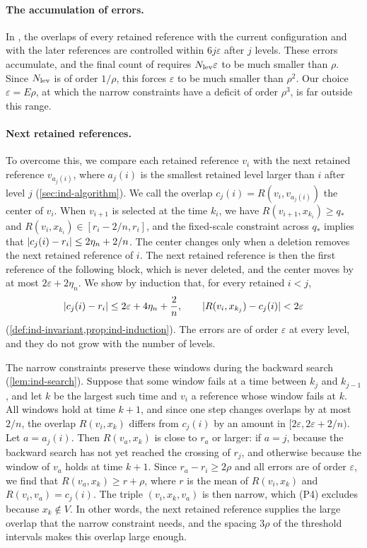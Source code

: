\paragraph{The accumulation of errors.} In
\cite[(8.19)--(8.20)]{oai-barriers}, the overlaps of every retained reference
with the current configuration and with the later references are controlled
within $6j\varepsilon$ after $j$ levels. These errors accumulate, and the final
count of \cite[(8.29)]{oai-barriers} requires $N_{\rm lev}\varepsilon$ to be
much smaller than $\rho$. Since $N_{\rm lev}$ is of order $1/\rho$, this forces
$\varepsilon$ to be much smaller than $\rho^2$. Our choice $\varepsilon=E\rho$,
at which the narrow constraints have a deficit of order $\rho^3$, is far outside
this range.

\paragraph{Next retained references.} To overcome this, we compare each
retained reference $v_i$ with the next retained reference $v_{a_j(i)}$, where
$a_j(i)$ is the smallest retained level larger than $i$ after level $j$
(\cref{sec:ind-algorithm}). We call the overlap $c_j(i)=R(v_i,v_{a_j(i)})$ the
center of $v_i$. When $v_{i+1}$ is selected at the time $k_i$, we have
$R(v_{i+1},x_{k_i})\ge q_*$ and $R(v_i,x_{k_i})\in[r_i-2/n,r_i]$, and the
fixed-scale constraint across $q_*$ implies that
$\lvert c_j(i)-r_i\rvert\le2\eta_n+2/n$. The center changes only when a deletion
removes the next retained reference of $i$. The next retained reference is then
the first reference of the following block, which is never deleted, and the
center moves by at most $2\varepsilon+2\eta_n$. We show by induction that, for
every retained $i<j$,
\[
 \lvert c_j(i)-r_i\rvert\le2\varepsilon+4\eta_n+\frac2n,\qquad
 \lvert R(v_i,x_{k_j})-c_j(i)\rvert<2\varepsilon
\]
(\cref{def:ind-invariant,prop:ind-induction}). The errors are of order
$\varepsilon$ at every level, and they do not grow with the number of levels.

The narrow constraints preserve these windows during the backward search
(\cref{lem:ind-search}). Suppose that some window fails at a time between
$k_j$ and $k_{j-1}$, and let $k$ be the largest such time and $v_i$ a
reference whose window fails at $k$. All windows hold at time $k+1$, and since
one step changes overlaps by at most $2/n$, the overlap $R(v_i,x_k)$ differs
from $c_j(i)$ by an amount in $[2\varepsilon,2\varepsilon+2/n)$. Let
$a=a_j(i)$. Then $R(v_a,x_k)$ is close to $r_a$ or larger: if $a=j$, because the
backward search has not yet reached the crossing of $r_j$, and otherwise
because the window of $v_a$ holds at time $k+1$. Since $r_a-r_i\ge2\rho$ and
all errors are of order $\varepsilon$, we find that $R(v_a,x_k)\ge r+\rho$, where $r$ is the mean of $R(v_i,x_k)$ and
$R(v_i,v_a)=c_j(i)$. The triple $(v_i,x_k,v_a)$ is then narrow, which (P4)
excludes because $x_k\notin V$. In other words, the next retained reference
supplies the large overlap that the narrow constraint needs, and the spacing
$3\rho$ of the threshold intervals makes this overlap large enough.

